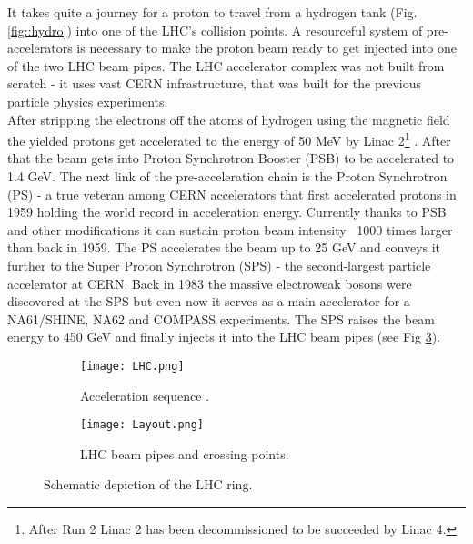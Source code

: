         It takes quite a journey for a proton to travel from a hydrogen tank (Fig. \ref{fig::hydro}) into one of the LHC's collision points. A resourceful system of pre-accelerators is necessary to make the proton beam ready to get injected into one of the two LHC beam pipes. The LHC accelerator complex was not built from scratch - it uses vast CERN infrastructure, that was built for the previous particle physics experiments. \\
        After stripping the electrons off the atoms of hydrogen using the magnetic field the yielded protons get accelerated to the energy of 50 MeV by Linac 2\footnote{After Run 2 Linac 2 has been decommissioned to be succeeded by Linac 4.} \cite{sequence}. After that the beam gets into Proton Synchrotron Booster (PSB) to be accelerated to 1.4 GeV. The next link of the pre-acceleration chain is the Proton Synchrotron (PS) - a true veteran among CERN accelerators that first accelerated protons in 1959 holding the world record in acceleration energy. Currently thanks to PSB and other modifications it can sustain proton beam intensity ~1000 times larger than back in 1959. The PS accelerates the beam up to 25 GeV and conveys it further to the Super Proton Synchrotron (SPS) - the second-largest particle accelerator at CERN. Back in 1983 the massive electroweak bosons were discovered at the SPS but even now it serves as a main accelerator for a NA61/SHINE, NA62 and COMPASS experiments. The SPS raises the beam energy to 450 GeV and finally injects it into the LHC beam pipes (see Fig \ref{fig::layout}).\\
   

	\begin{figure}[htbp]
	\begin{subfigure}[t]{0.48\textwidth}
		\texttt{[image: LHC.png]}
		\caption[Acceleration sequence]{Acceleration sequence \cite{sequence}.}
		\label{fig::seq}
	\end{subfigure}
	\hfill
	\begin{subfigure}[t]{0.48\textwidth}
		\texttt{[image: Layout.png]}
		\caption[Beam pipes]{LHC beam pipes and crossing points.}
		\label{fig::pipes}
	\end{subfigure}
	\caption{Schematic depiction of the LHC ring.}
	\label{fig::layout}
\end{figure}


